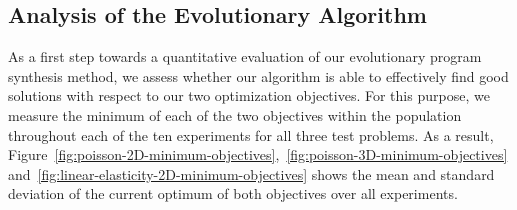 \subsection{Analysis of the Evolutionary Algorithm}
\label{sec:experiments1-algorithm-behavior-analysis}
As a first step towards a quantitative evaluation of our evolutionary program synthesis method, we assess whether our algorithm is able to effectively find good solutions with respect to our two optimization objectives.
For this purpose, we measure the minimum of each of the two objectives within the population throughout each of the ten experiments for all three test problems.
As a result, Figure~\ref{fig:poisson-2D-minimum-objectives},~\ref{fig:poisson-3D-minimum-objectives} and~\ref{fig:linear-elasticity-2D-minimum-objectives} shows the mean and standard deviation of the current optimum of both objectives over all experiments.
